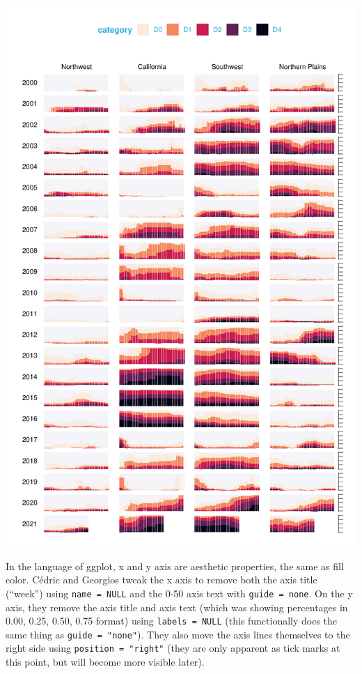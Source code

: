 \documentclass[
]{book}
\begin{document}
\includegraphics[width=1\linewidth]{data-viz_files/figure-latex/unnamed-chunk-30-1}

In the language of ggplot, x and y axis are aesthetic properties, the same as fill color. Cédric and Georgios tweak the x axis to remove both the axis title (``week'') using \texttt{name\ =\ NULL} and the 0-50 axis text with \texttt{guide\ =\ none}. On the y axis, they remove the axis title and axis text (which was showing percentages in 0.00, 0.25, 0.50, 0.75 format) using \texttt{labels\ =\ NULL} (this functionally does the same thing as \texttt{guide\ =\ "none"}). They also move the axis lines themselves to the right side using \texttt{position\ =\ "right"} (they are only apparent as tick marks at this point, but will become more visible later).
\end{document}
